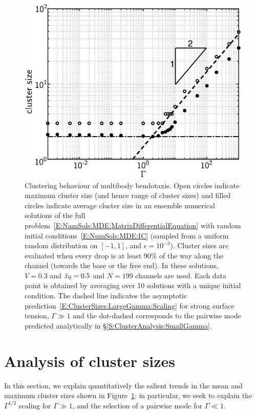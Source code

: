 \begin{figure}[t]
\centering
\includegraphics[scale=0.5]{cluster_size_vs_Gamma}
\caption{Clustering behaviour of multibody bendotaxis. Open circles indicate maximum cluster size (and hence range of cluster sizes) and filled circles indicate average cluster size in an ensemble numerical solutions of the full problem~\eqref{E:NumSols:MDE:MatrixDifferentialEquation} with random initial conditions~\eqref{E:NumSols:MDE:IC} (sampled from a uniform random distribution on $\left[-1,1\right]$, and $\epsilon = 10^{-3}$). Cluster sizes are evaluated when every drop is at least 90$\%$ of the way along the channel (towards the base or the free end). In these solutions, $V = 0.3$ and $\bar{x}_0 = 0.5$ and $N = 199$ channels are used. Each data point is obtained by averaging over 10 solutions with a unique initial condition. The dashed line indicates the asymptotic prediction~\eqref{E:ClusterSizes:LargeGamma:Scaling} for strong surface tension, $\Gamma \gg 1$ and the dot-dashed corresponds to the pairwise mode predicted analytically in \S\ref{S:ClusterAnalysis:SmallGamma}.  }\label{fig:LSA:Clustering:ClusterSizes}
\end{figure}

\section{Analysis of cluster sizes}\label{S:ClusterAnalysis}
In this section, we explain quantitatively the salient trends in the mean and maximum cluster sizes shown in Figure~\ref{fig:LSA:Clustering:ClusterSizes}: in particular, we seek to explain the $\Gamma^{1/2}$ scaling for  $\Gamma \gg 1$, and the selection of a pairwise mode for $\Gamma \ll 1$.

